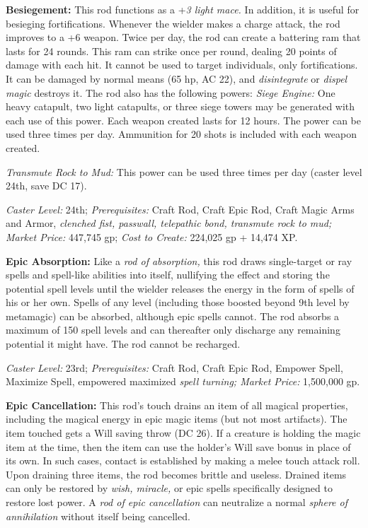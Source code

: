 \documentclass{article}
\begin{document}
\vspace{12pt}
\textbf{Besiegement:  }This rod functions as a +\textit{3 light mace. }In addition, 
it is useful for besieging fortifications. Whenever the wielder makes a charge 
attack, the rod improves to a +6 weapon. Twice per day, the rod can create a battering 
ram that lasts for 24 rounds. This ram can strike once per round, dealing 20 points 
of damage with each hit. It cannot be used to target individuals, only fortifications. 
It can be damaged by normal means (65 hp, AC 22), and \textit{disintegrate }or 
\textit{dispel magic }destroys it. The rod also has the following powers: \textit{Siege 
Engine: }One heavy catapult, two light catapults, or three siege towers may be 
generated with each use of this power. Each weapon created lasts for 12 hours. 
 The power can be used three times per day. Ammunition for 20 shots is included 
with each weapon created. 

\textit{Transmute Rock to Mud: }This power can be used three times per day (caster 
level 24th, save DC 17). 

\textit{Caster Level: }24th; \textit{Prerequisites: }Craft Rod, Craft Epic Rod, 
Craft Magic Arms and Armor, \textit{clenched fist, passwall,  telepathic bond, 
transmute rock to mud; Market Price: }447,745 gp; \textit{Cost to Create: }224,025 
gp + 14,474 XP. 

\textbf{Epic Absorption: }Like a \textit{rod of absorption, }this rod draws single-target 
or ray spells and spell-like abilities into itself, nullifying the effect and storing 
the potential spell levels until the wielder releases the energy in the form of 
spells of his or her own. Spells of any level (including those boosted beyond 9th 
level by metamagic) can be absorbed, although epic spells cannot. The rod absorbs 
a maximum of 150 spell levels and can thereafter only discharge any remaining potential 
it might have. The rod cannot be recharged. 

\textit{Caster Level: }23rd; \textit{Prerequisites: }Craft Rod, Craft Epic Rod, 
Empower Spell, Maximize Spell, empowered maximized \textit{spell turning; Market 
Price: }1,500,000 gp. 

\textbf{Epic Cancellation: }This rod's touch drains an item of all magical properties, 
including the magical energy in epic magic items (but not most artifacts). The 
item touched gets a Will saving throw (DC 26). If a creature is holding the magic 
item at the time, then the item can use the holder's Will save bonus in place of 
its own. In such cases, contact is established by making a melee touch attack roll. 
Upon draining three items, the rod becomes brittle and useless. Drained items can 
only be restored by \textit{wish, miracle, }or epic spells specifically designed 
to restore lost power. A \textit{rod of epic cancellation }can neutralize a normal 
\textit{sphere of annihilation }without itself being cancelled. 
\end{document}
